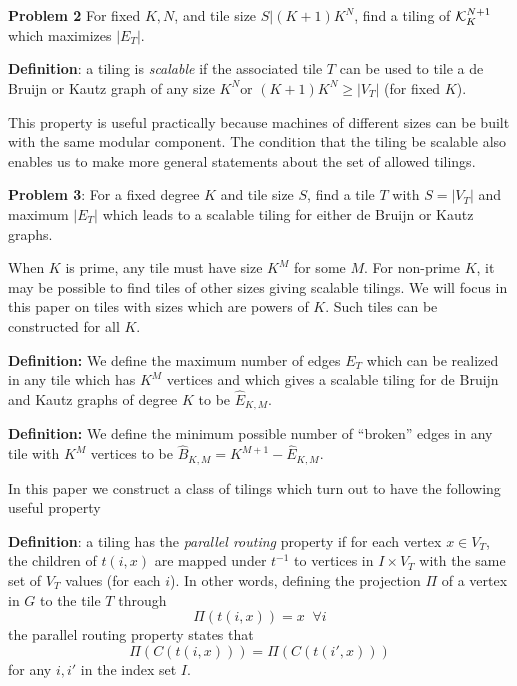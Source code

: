 \documentclass[12pt]{article}
\begin{document}
\vspace*{0.1in}
\noindent
{\bf Problem 2} For fixed $K, N$, and tile size $S | (K + 1) K^N$,
find a tiling of ${\cal K}_K^{N + 1}$ which maximizes $|E_T|$.
\vspace*{0.1in}


\vspace*{0.1in}
\noindent
{\bf Definition}: a tiling is {\it scalable} if the associated tile
$T$ can be used to tile a de Bruijn or Kautz graph of any size $K^N
$or $(K + 1)K^N \geq
|V_T|$ (for  fixed $K$).
\vspace*{0.1in}

This property is useful practically because machines of different
sizes can be built with the same modular component.
The condition that the tiling be scalable also enables us to make more
general statements about the set of allowed tilings.
\vspace*{0.1in}

\noindent
{\bf Problem 3}: For a fixed degree $K$ and tile size $S$,
find a tile $T$ with $S = | V_T |$ and
maximum $|E_T|$
which leads to a scalable tiling
for either de Bruijn or Kautz graphs.
\vspace*{0.1in}

When $K$ is prime, any tile must have size
$K^M$ for some $M$.  For non-prime $K$, it may be possible to find
tiles of other sizes giving scalable tilings.  We will focus in this
paper on tiles with sizes which are powers of $K$.  Such tiles can be
constructed for all $K$.

\vspace*{0.1in}
\noindent
{\bf Definition:} We define the maximum number of edges $E_T$ which
can be realized in any tile which has $K^M$ vertices and 
which gives a scalable tiling for de Bruijn and Kautz graphs of degree
$K$ to be
$\hat{E}_{K, M}$.

\vspace*{0.1in}
\noindent
{\bf Definition:} We define the minimum possible number of ``broken'' edges in
any tile with $K^M$ vertices to be
$\hat{B}_{K, M}= K^{M + 1}-\hat{E}_{K, M}$.
\vspace*{0.1in}



In this paper we construct a class of tilings which turn out to have
the following useful property 

\vspace*{0.1in}
\noindent
{\bf Definition}: a tiling has the {\it parallel routing} property if for
each vertex $x \in V_T$, the children of $t (i, x)$  
are mapped
under $t^{-1}$ to vertices in $I \times V_T$ with the same set of $V_T$
values  (for each $i$).
\vspace*{0.1in}
In other words, defining the projection $\Pi$ of a vertex in $G$ to
the tile $T$ through
\begin{equation}
 \Pi (t (i, x)) = x\; \; \forall i
\end{equation}
the parallel routing property states that
\begin{equation}
\Pi (C (t (i, x))) = \Pi (C (t (i', x)))
\label{eq:parallel}
\end{equation}
for any $i, i'$ in the index set $I$.
\vspace*{0.1in}
\end{document}
